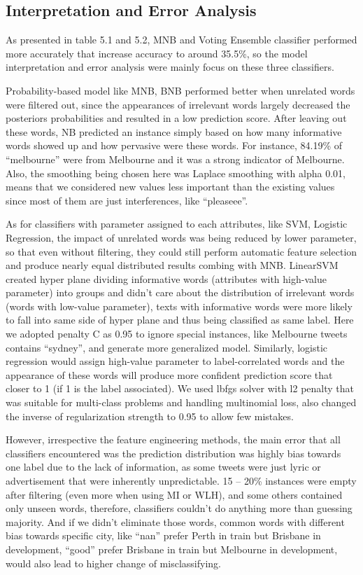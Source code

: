 \documentclass[11pt]{article}
\begin{document}
\subsection{Interpretation and Error Analysis}

As presented in table 5.1 and 5.2, MNB and Voting Ensemble classifier performed more accurately that increase accuracy to around 35.5\%, so the model interpretation and error analysis were mainly focus on these three classifiers.

Probability-based model like MNB, BNB performed better when unrelated words were filtered out, since the appearances of irrelevant words largely decreased the posteriors probabilities and resulted in a low prediction score. After leaving out these words, NB predicted an instance simply based on how many informative words showed up and how pervasive were these words. For instance, 84.19\% of “melbourne” were from Melbourne and it was a strong indicator of Melbourne. Also, the smoothing being chosen here was Laplace smoothing with alpha 0.01, means that we considered new values less important than the existing values since most of them are just interferences, like “pleaseee”.

As for classifiers with parameter assigned to each attributes, like SVM, Logistic Regression, the impact of unrelated words was being reduced by lower parameter, so that even without filtering, they could still perform automatic feature selection and produce nearly equal distributed results combing with MNB. LinearSVM created hyper plane dividing informative words (attributes with high-value parameter) into groups and didn’t care about the distribution of irrelevant words (words with low-value parameter), texts with informative words were more likely to fall into same side of hyper plane and thus being classified as same label. Here we adopted penalty C as 0.95 to ignore special instances, like Melbourne tweets contains “sydney”, and generate more generalized model. Similarly, logistic regression would assign high-value parameter to label-correlated words and the appearance of these words will produce more confident prediction score that closer to 1 (if 1 is the label associated). We used lbfgs solver with l2 penalty that was suitable for multi-class problems and handling multinomial loss, also changed the inverse of regularization strength to 0.95 to allow few mistakes.

However, irrespective the feature engineering methods, the main error that all classifiers encountered was the prediction distribution was highly bias towards one label due to the lack of information, as some tweets were just lyric or advertisement that were inherently unpredictable. 15 – 20\% instances were empty after filtering (even more when using MI or WLH), and some others contained only unseen words, therefore, classifiers couldn’t do anything more than guessing majority. And if we didn’t eliminate those words, common words with different bias towards specific city, like “nan” prefer Perth in train but Brisbane in development, “good” prefer Brisbane in train but Melbourne in development, would also lead to higher change of misclassifying. 
\end{document}

